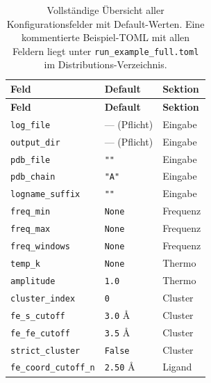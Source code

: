 \documentclass[11pt,a4paper,twoside]{article}
\theoremstyle{remark}
\begin{document}
\begin{longtable}{p{} p{} p{}}
\caption{Vollst\"andige \"Ubersicht aller Konfigurationsfelder mit
Default-Werten. Eine kommentierte Beispiel-TOML mit allen Feldern liegt
unter \texttt{run\_example\_full.toml} im Distributions-Verzeichnis.}
\label{tab:param-overview} \\
\toprule
\textbf{Feld} & \textbf{Default} & \textbf{Sektion} \\
\midrule
\endfirsthead
\toprule
\textbf{Feld} & \textbf{Default} & \textbf{Sektion} \\
\midrule
\endhead
\texttt{log\_file}                  & --- (Pflicht)        & Eingabe \\
\texttt{output\_dir}                & --- (Pflicht)        & Eingabe \\
\texttt{pdb\_file}                  & \texttt{""}          & Eingabe \\
\texttt{pdb\_chain}                 & \texttt{"A"}         & Eingabe \\
\texttt{logname\_suffix}            & \texttt{""}          & Eingabe \\
\midrule
\texttt{freq\_min}                  & \texttt{None}        & Frequenz \\
\texttt{freq\_max}                  & \texttt{None}        & Frequenz \\
\texttt{freq\_windows}              & \texttt{None}        & Frequenz \\
\midrule
\texttt{temp\_k}                    & \texttt{None}        & Thermo \\
\texttt{amplitude}                  & \texttt{1.0}         & Thermo \\
\midrule
\texttt{cluster\_index}             & \texttt{0}           & Cluster \\
\texttt{fe\_s\_cutoff}              & \texttt{3.0} \AA     & Cluster \\
\texttt{fe\_fe\_cutoff}             & \texttt{3.5} \AA     & Cluster \\
\texttt{strict\_cluster}            & \texttt{False}       & Cluster \\
\midrule
\texttt{fe\_coord\_cutoff\_n}       & \texttt{2.50} \AA    & Ligand \\

\end{longtable}
\end{document}
